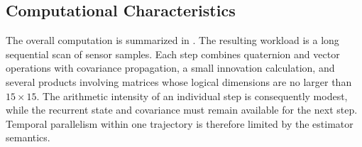 \documentclass[research]{fcs}
\begin{document}
\subsection{Computational Characteristics}
\label{subsec:workload-characteristics}

The overall computation is summarized in . The resulting workload is a long sequential scan of sensor samples. Each step combines quaternion and vector operations with covariance propagation, a small innovation calculation, and several products involving matrices whose logical dimensions are no larger than $15\times15$. The arithmetic intensity of an individual step is consequently modest, while the recurrent state and covariance must remain available for the next step. Temporal parallelism within one trajectory is therefore limited by the estimator semantics.
\end{document}
